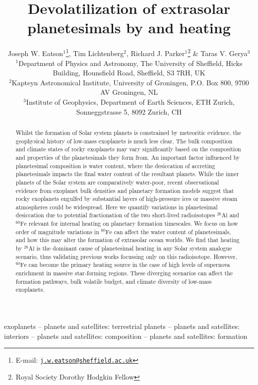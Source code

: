\documentclass[fleqn,usenatbib]{mnras}
\title[Devolatilization of planetesimals by SLRs]{Devolatilization of extrasolar planetesimals by \fe{} and \al{} heating}
\author[J. W. Eatson et al.]{
Joseph W. Eatson$^{1}$\thanks{E-mail: \texttt{\href{mailto:j.w.eatson@sheffield.ac.uk}{j.w.eatson@sheffield.ac.uk}}},
Tim Lichtenberg$^{2}$,
Richard J. Parker$^{1}$\thanks{Royal Society Dorothy Hodgkin Fellow}
\&
Taras V. Gerya$^{3}$
\\
$^{1}$Department of Physics and Astronomy, The University of Sheffield, Hicks Building, Hounsfield Road, Sheffield, S3 7RH, UK\\
$^{2}$Kapteyn Astronomical Institute, University of Groningen, P.O. Box 800, 9700 AV Groningen, NL\\
$^{3}$Institute of Geophysics, Department of Earth Sciences, ETH Zurich, Sonneggstrasse 5, 8092 Zurich, CH\\
}
\newcommand{\atom}[2]{$^{#2}\text{#1}$}
\newcommand{\al}{\atom{Al}{26}}
\newcommand{\fe}{\atom{Fe}{60}}
\begin{document}
\label{firstpage}
\pagerange{\pageref{firstpage}--\pageref{lastpage}}
\maketitle

\begin{abstract}
\noindent
Whilst the formation of Solar system planets is constrained by meteoritic evidence, the geophysical history of low-mass exoplanets is much less clear. The bulk composition and climate states of rocky exoplanets may vary significantly based on the composition and properties of the planetesimals they form from. An important factor influenced by planetesimal composition is water content, where the desiccation of accreting planetesimals impacts the final water content of the resultant planets. While the inner planets of the Solar system are comparatively water-poor, recent observational evidence from exoplanet bulk densities and planetary formation models suggest that rocky exoplanets engulfed by substantial layers of high-pressure ices or massive steam atmospheres could be widespread. Here we quantify variations in planetesimal desiccation due to potential fractionation of the two short-lived radioisotopes \al{} and \fe{} relevant for internal heating on planetary formation timescales. We focus on how order of magnitude variations in \fe{} can affect the water content of planetesimals, and how this may alter the formation of extrasolar ocean worlds. We find that heating by \al{} is the dominant cause of planetesimal heating in any Solar system analogue scenario, thus validating previous works focussing only on this radioisotope. However, \fe{} can become the primary heating source in the case of high levels of supernova enrichment in massive star-forming regions. These diverging scenarios can affect the formation pathways, bulk volatile budget, and climate diversity of low-mass exoplanets.
\end{abstract}



\begin{keywords}
exoplanets -- planets and satellites: terrestrial planets -- planets and satellites: interiors --  planets and satellites: composition -- planets and satellites: formation
\end{keywords}
\end{document}

